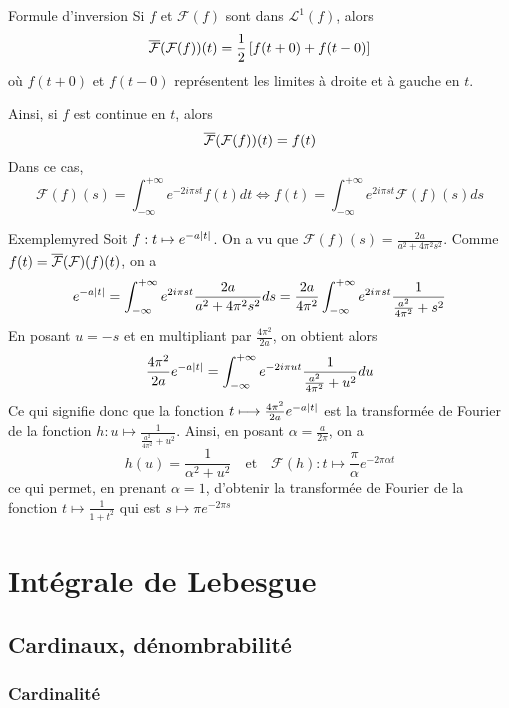     \begin{theo}{Formule d’inversion}{}
        Si $f$ et $\mathcal{F}(f)$ sont dans $\mathcal{L}^1(f)$, alors 
        \[ \overline{\mathcal{F}}(\mathcal{F}(f))(t) = \frac{1}{2} \left[f(t+0) + f(t-0)\right] \] 
        où $f(t+0)$ et $f(t-0)$ représentent les limites à droite et à gauche en $t$.

        Ainsi, si $f$ est continue en $t$, alors 
        \[ \overline{\mathcal{F}}(\mathcal{F}(f))(t) = f(t) \] 
        Dans ce cas,
        \[ \mathcal{F}(f)(s) = \int_{-\infty}^{+\infty} e^{-2i\pi st}f(t)dt \iff f(t) = \int_{-\infty}^{+\infty} e^{2i\pi st} \mathcal{F}(f)(s)ds \]
    \end{theo}

    \begin{omed}{Exemple}{myred}
        Soit $f : t \mapsto e^{-a\left\lvert t\right\rvert}$. On a vu que $\mathcal{F}(f)(s) = \frac{2a}{a^2 + 4 \pi^2 s^2}$. Comme $f(t) = \overline{\mathcal{F}}(\mathcal{F})(f)(t)$, on a 
        \[ e^{-a\left\lvert t\right\rvert} = \int_{-\infty}^{+\infty} e^{2i \pi st} \frac{2a}{a^2 + 4 \pi^2 s^2} ds = \frac{2a}{4 \pi^2} \int_{-\infty}^{+\infty} e^{2i \pi s t} \frac{1}{\frac{a^2}{4\pi^2} + s^2} \] 
        En posant $u = -s$ et en multipliant par $\frac{4 \pi^2}{2a}$, on obtient alors 
        \[ \frac{4 \pi^2}{2a} e^{-a \left\lvert t\right\rvert} = \int_{-\infty}^{+\infty} e^{-2 i \pi u t} \frac{1}{\frac{a^2}{4\pi^2} + u^2} du \] 
        Ce qui signifie donc que la fonction $t \longmapsto \frac{4 \pi^2}{2a} e^{-a \left\lvert t\right\rvert}$ est la transformée de Fourier de la fonction $h : u \mapsto \frac{1}{\frac{a^2}{4\pi^2} + u^2}$. Ainsi, en posant $\alpha = \frac{a}{2\pi}$, on a 
        \[ h(u) = \frac{1}{\alpha^2 + u^2} \quad \text{et} \quad \mathcal{F}(h) : t \mapsto \frac{\pi}{\alpha} e^{-2 \pi \alpha t} \] 
        ce qui permet, en prenant $\alpha = 1$, d’obtenir la transformée de Fourier de la fonction $t \longmapsto \frac{1}{1+t^2}$ qui est $s \longmapsto \pi e^{-2 \pi s}$
    \end{omed}

\section{Intégrale de Lebesgue}

\subsection{Cardinaux, dénombrabilité}

    \subsubsection{Cardinalité}


